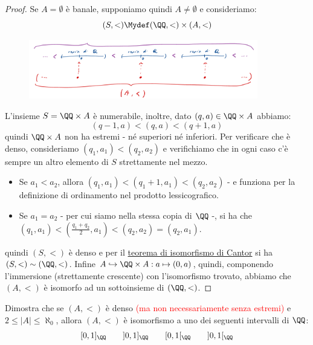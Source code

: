 \begin{proof}
	Se $A = \emptyset$ è banale, supponiamo quindi $A \ne \emptyset$ e consideriamo:
	\[ (S,<) \Mydef (\QQ,<) \times (A,<)
		\]
	\begin{figure}[H]
		\centering
		\includegraphics[width = 10cm]{immagini/coroll_iso_cantor.png}
	\end{figure}
	L'insieme $S = \QQ \times A$ è numerabile, inoltre, dato $(q,a) \in \QQ \times A$ abbiamo:
	\[ (q-1,a) < (q,a) < (q+1,a) 
		\]
	quindi $\QQ \times A$ non ha estremi - né superiori né inferiori. Per verificare che è denso, consideriamo $(q_1,a_1) < (q_2, a_2)$ e verifichiamo che in ogni caso c'è sempre un altro elemento di $S$ strettamente nel mezzo.
	\begin{itemize}
		\item Se $a_1 < a_2$, allora $(q_1,a_1) < (q_1+1,a_1) < (q_2,a_2)$ - e funziona per la definizione di ordinamento nel prodotto lessicografico.
		\item Se $a_1 = a_2$ - per cui siamo nella stessa copia di $\QQ$ -, si ha che $(q_1,a_1) < \left(\frac{q_1+q_2}{2},a_1\right) < (q_2,a_2) = (q_2,a_1)$.
	\end{itemize}
	quindi $(S,<)$ è denso e per il \hyperref[isoCantor]{teorema di isomorfismo di Cantor} si ha $(S,<) \sim (\QQ,<)$.
	Infine $A \hookrightarrow \QQ \times A : a \mapsto (0,a)$, quindi, componendo l'immersione (strettamente crescente) con l'isomorfismo trovato, abbiamo che $(A,<)$ è isomorfo ad un sottoinsieme di $(\QQ,<)$. 
\end{proof}

\begin{exercise}
	Dimostra che se $(A,<)$ è denso \textcolor{red}{(ma non necessariamente senza estremi)} e $2 \leq |A| \leq \aleph_0$, allora $(A,<)$ è isomorfismo a uno dei seguenti intervalli di $\QQ$:
	\[ [0,1]_{\QQ} \qquad ]0,1]_{\QQ} \qquad [0,1[_{\QQ} \qquad ]0,1[_{\QQ}
		\]
\end{exercise}

